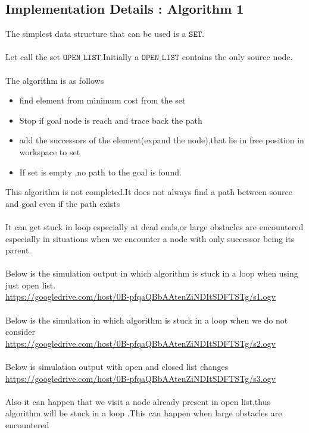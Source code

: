 \documentclass[fontsize=12pt, %
                             paper=a4, %
                             oneside, %
                             captions=tableheading,
                             index=totoc,
                             hyperref]{labbook}
\newcommand{\vurl}[1]{\url{#1}}
\begin{document}
\subsection{Implementation Details : Algorithm 1}
The simplest data structure that can be used is a $ \texttt{SET} $.
\\\\
Let call the set $\texttt{OPEN\_LIST}$.Initially a $\texttt{OPEN\_LIST}$ contains the only source node.
\\\\
The algorithm is as follows
\begin{itemize}
 \item find element from minimum cost from the set
 \item Stop if goal node is reach and trace back the path
 \item add the successors of the element(expand the node),that lie in free position in workspace to set
\item If set is empty ,no path to the goal is found.
\end{itemize}
This algorithm is not completed.It does not always find a path between source and goal
even if the path exists
\\\\
It can get stuck in loop especially at dead ends,or large obstacles are encountered
especially in situations when we encounter a node with only successor being its parent.
\\\\
Below is the simulation output in which algorithm is stuck in a loop
when using just open list.\\
\vurl{https://googledrive.com/host/0B-pfqaQBbAAtenZiNDItSDFTSTg/s1.ogv}
\\\\
Below is the simulation in which algorithm is stuck in a loop when
we do not consider \\
\vurl{https://googledrive.com/host/0B-pfqaQBbAAtenZiNDItSDFTSTg/s2.ogv}
\\\\
Below is simulation output with open and closed list changes\\
\vurl{https://googledrive.com/host/0B-pfqaQBbAAtenZiNDItSDFTSTg/s3.ogv}
\\\\
Also it can happen that we visit a node already present in open list,thus algorithm
will be stuck in a loop .This can happen when large obstacles are encountered
\\\\
\end{document}
